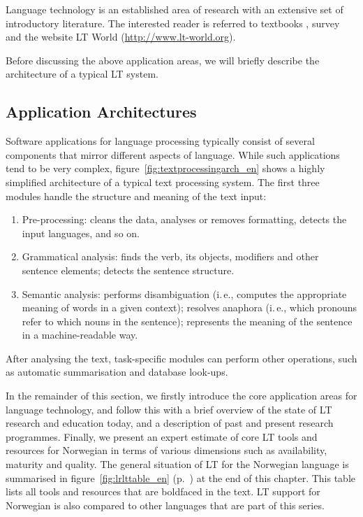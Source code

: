 \begin{multicols}{2}
Language technology is an established area of research with an
extensive set of introductory literature.  The interested reader is
referred to textbooks \cite{jurafsky-martin01, manning-schuetze1},
survey \cite{lt-survey1} and the website LT World
(\url{http://www.lt-world.org}).

Before discussing the above application areas, we will briefly
describe the architecture of a typical LT system.

\subsection{Application Architectures}

Software applications for language processing typically consist of
several components that mirror different aspects of language. While
such applications tend to be very complex,
figure~\ref{fig:textprocessingarch_en} shows a highly simplified
architecture of a typical text processing system. The first three
modules handle the structure and meaning of the text input:

\begin{enumerate}
\item Pre-processing: cleans the data, analyses or removes formatting,
  detects the input languages, and so on.
\item Grammatical analysis: finds the verb, its objects, modifiers and
  other sentence elements; detects the sentence structure.
\item Semantic analysis: performs disambiguation (i.\,e., computes the
  appropriate meaning of words in a given context); resolves anaphora
  (i.\,e., which pronouns refer to which nouns in the sentence);
  represents the meaning of the sentence in a machine-readable way.
\end{enumerate}

After analysing the text, task-specific modules can perform other
operations, such as automatic summarisation and database look-ups.

In the remainder of this section, we firstly introduce the core
application areas for language technology, and follow this with a
brief overview of the state of LT research and education today, and a
description of past and present research programmes. Finally, we
present an expert estimate of core LT tools and resources for
Norwegian in terms of various dimensions such as availability,
maturity and quality. The general situation of LT for the Norwegian
language is summarised in figure~\ref{fig:lrlttable_en}
(p.~\pageref{fig:lrlttable_en}) at the end of this chapter. This table
lists all tools and resources that are boldfaced in the text. LT
support for Norwegian is also compared to other languages that are
part of this series.


\end{multicols}
